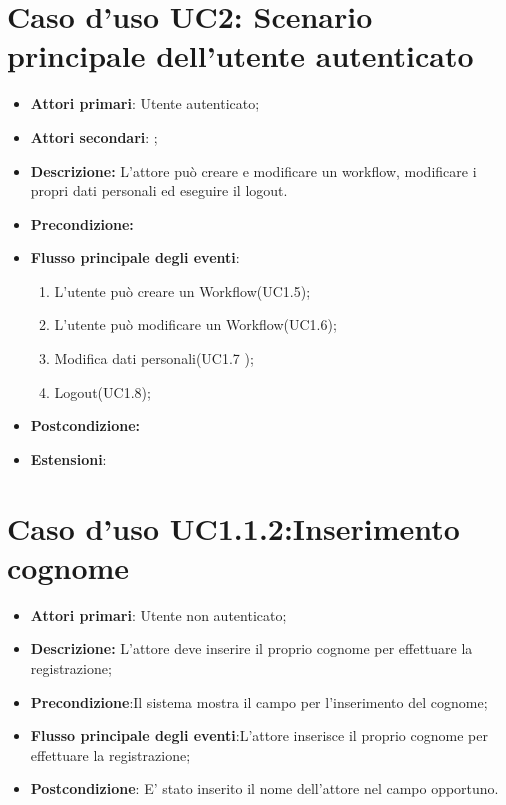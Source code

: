 {{{\section{Caso d'uso UC2: Scenario principale dell'utente autenticato}
\begin{itemize}
	\item \textbf{Attori primari}: Utente autenticato;
	\item \textbf{Attori secondari}: ;
	\item \textbf{Descrizione:} L'attore può creare e modificare un workflow, modificare i propri dati personali ed eseguire il logout.
	\item \textbf{Precondizione:}
	\item \textbf{Flusso principale degli eventi}:
	\begin{enumerate}
		\item L'utente può creare un Workflow(UC1.5);
		\item L'utente può modificare un Workflow(UC1.6);
		\item Modifica dati personali(UC1.7 );
		\item Logout(UC1.8);
	\end{enumerate}
	\item \textbf{Postcondizione:} 
	\item \textbf{Estensioni}:
\end{itemize}


\section{Caso d'uso UC1.1.2:Inserimento cognome}
\begin{itemize}
	\item \textbf{Attori primari}: Utente non autenticato;
	\item \textbf{Descrizione:} L'attore deve inserire il proprio cognome per effettuare la registrazione;
	\item \textbf{Precondizione}:Il sistema mostra il campo per l'inserimento del cognome;
	\item \textbf{Flusso principale degli eventi}:L'attore inserisce il proprio cognome per effettuare la registrazione;
	\item \textbf{Postcondizione}: E' stato inserito il nome dell'attore nel campo opportuno.
\end{itemize}

}}}
